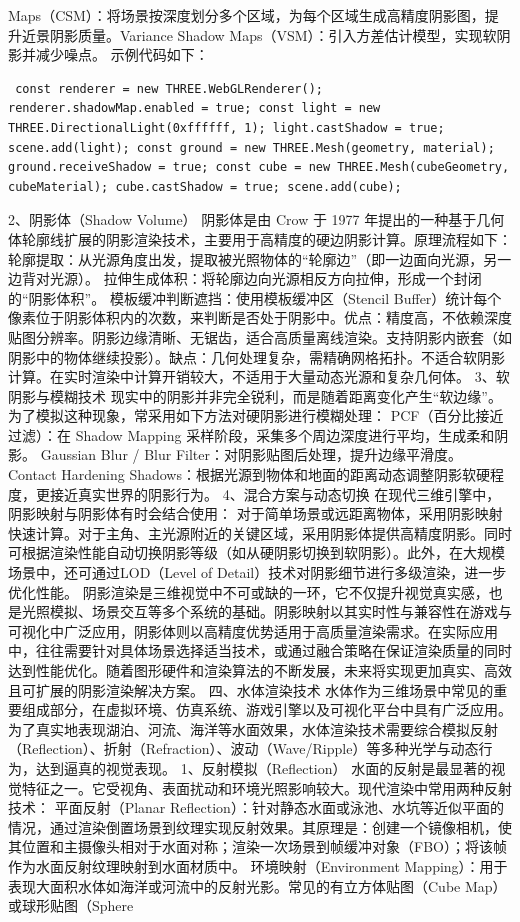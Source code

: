 {{Maps（CSM）：将场景按深度划分多个区域，为每个区域生成高精度阴影图，提升近景阴影质量。Variance Shadow Maps（VSM）：引入方差估计模型，实现软阴影并减少噪点。 示例代码如下： \begin{verbatim} const renderer = new THREE.WebGLRenderer(); renderer.shadowMap.enabled = true; const light = new THREE.DirectionalLight(0xffffff, 1); light.castShadow = true; scene.add(light); const ground = new THREE.Mesh(geometry, material); ground.receiveShadow = true; const cube = new THREE.Mesh(cubeGeometry, cubeMaterial); cube.castShadow = true; scene.add(cube); \end{verbatim} 2、阴影体（Shadow Volume） 阴影体是由 Crow 于 1977 年提出的一种基于几何体轮廓线扩展的阴影渲染技术，主要用于高精度的硬边阴影计算。原理流程如下： 轮廓提取：从光源角度出发，提取被光照物体的``轮廓边''（即一边面向光源，另一边背对光源）。 拉伸生成体积：将轮廓边向光源相反方向拉伸，形成一个封闭的``阴影体积''。 模板缓冲判断遮挡：使用模板缓冲区（Stencil Buffer）统计每个像素位于阴影体积内的次数，来判断是否处于阴影中。优点：精度高，不依赖深度贴图分辨率。阴影边缘清晰、无锯齿，适合高质量离线渲染。支持阴影内嵌套（如阴影中的物体继续投影）。缺点：几何处理复杂，需精确网格拓扑。不适合软阴影计算。在实时渲染中计算开销较大，不适用于大量动态光源和复杂几何体。 3、软阴影与模糊技术 现实中的阴影并非完全锐利，而是随着距离变化产生``软边缘''。为了模拟这种现象，常采用如下方法对硬阴影进行模糊处理： PCF（百分比接近过滤）：在 Shadow Mapping 采样阶段，采集多个周边深度进行平均，生成柔和阴影。 Gaussian Blur / Blur Filter：对阴影贴图后处理，提升边缘平滑度。 Contact Hardening Shadows：根据光源到物体和地面的距离动态调整阴影软硬程度，更接近真实世界的阴影行为。 4、混合方案与动态切换 在现代三维引擎中，阴影映射与阴影体有时会结合使用： 对于简单场景或远距离物体，采用阴影映射快速计算。对于主角、主光源附近的关键区域，采用阴影体提供高精度阴影。同时可根据渲染性能自动切换阴影等级（如从硬阴影切换到软阴影）。此外，在大规模场景中，还可通过LOD（Level of Detail）技术对阴影细节进行多级渲染，进一步优化性能。 阴影渲染是三维视觉中不可或缺的一环，它不仅提升视觉真实感，也是光照模拟、场景交互等多个系统的基础。阴影映射以其实时性与兼容性在游戏与可视化中广泛应用，阴影体则以高精度优势适用于高质量渲染需求。在实际应用中，往往需要针对具体场景选择适当技术，或通过融合策略在保证渲染质量的同时达到性能优化。随着图形硬件和渲染算法的不断发展，未来将实现更加真实、高效且可扩展的阴影渲染解决方案。 四、水体渲染技术 水体作为三维场景中常见的重要组成部分，在虚拟环境、仿真系统、游戏引擎以及可视化平台中具有广泛应用。为了真实地表现湖泊、河流、海洋等水面效果，水体渲染技术需要综合模拟反射（Reflection）、折射（Refraction）、波动（Wave/Ripple）等多种光学与动态行为，达到逼真的视觉表现。 1、反射模拟（Reflection） 水面的反射是最显著的视觉特征之一。它受视角、表面扰动和环境光照影响较大。现代渲染中常用两种反射技术： 平面反射（Planar Reflection）：针对静态水面或泳池、水坑等近似平面的情况，通过渲染倒置场景到纹理实现反射效果。其原理是：创建一个镜像相机，使其位置和主摄像头相对于水面对称；渲染一次场景到帧缓冲对象（FBO）；将该帧作为水面反射纹理映射到水面材质中。 环境映射（Environment Mapping）：用于表现大面积水体如海洋或河流中的反射光影。常见的有立方体贴图（Cube Map）或球形贴图（Sphere }}
